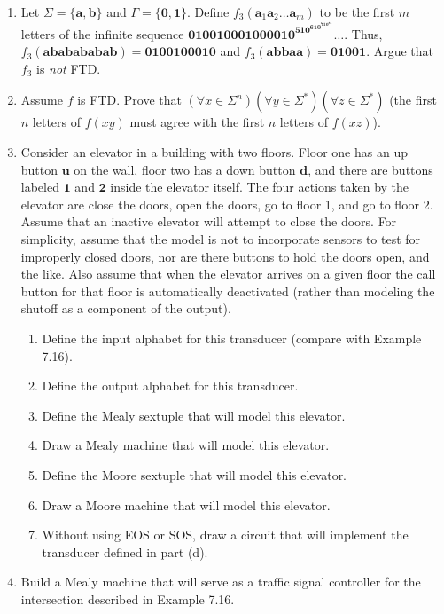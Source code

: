 \begin{enumerate}[{7.}1.]
\item Let $\Sigma=\{\pmb{a},\pmb{b}\}$ and $\Gamma=\{\pmb{0},\pmb{1}\}$. Define
$f_3(\pmb{a}_1\pmb{a}_2\ldots \pmb{a}_m)$ to be the first $m$ letters of the infinite
sequence $\pmb{010010001000010^510^610^710^81}\ldots$. Thus,
$f_3(\pmb{ababababab})=\pmb{0100100010}$ and $f_3(\pmb{abbaa})=\pmb{01001}$.
Argue that $f_3$ is \emph{not} FTD.

\item Assume $f$ is FTD. Prove that $(\forall x \in \Sigma^n)(\forall y \in
\Sigma^*)(\forall z \in \Sigma^*)$ (the first $n$ letters of $f(xy)$ must agree
with the first $n$ letters of $f(xz)$).

\item Consider an elevator in a building with two floors. Floor one has an up
button $\pmb{u}$ on the wall, floor two has a down button $\pmb{d}$, and there are
buttons labeled $\pmb{1}$ and $\pmb{2}$ inside the elevator itself. The four actions
taken by the elevator are close the doors, open the doors, go to floor 1, and go
to floor 2. Assume that an inactive elevator will attempt to close the doors.
For simplicity, assume that the model is not to incorporate sensors to test for
improperly closed doors, nor are there buttons to hold the doors open, and the
like. Also assume that when the elevator arrives on a given floor the call
button for that floor is automatically deactivated (rather than modeling the
shutoff as a component of the output).
\begin{enumerate}
\item Define the input alphabet for this transducer (compare with Example 7.16).
\item Define the output alphabet for this transducer.
\item Define the Mealy sextuple that will model this elevator.
\item Draw a Mealy machine that will model this elevator.
\item Define the Moore sextuple that will model this elevator.
\item Draw a Moore machine that will model this elevator.
\item Without using \<EOS\> or \<SOS\>, draw a circuit that will implement the
transducer defined in part (d).
\end{enumerate}

\item Build a Mealy machine that will serve as a traffic signal controller for
the intersection described in Example 7.16.


\end{enumerate}
